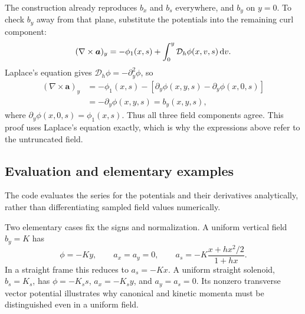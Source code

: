 The construction already reproduces \(b_x\) and \(b_s\) everywhere,
and \(b_y\) on \(y=0\). To check \(b_y\) away from that plane,
substitute the potentials into the remaining curl component:
\begin{equation}
 (\nabla\times\bm a)_y
 =-\phi_1(x,s)+\int_0^y\mathcal D_h\phi(x,v,s)\,\text{d} v.
\end{equation}
Laplace's equation gives \(\mathcal D_h\phi=-\partial_y^2\phi\), so
\begin{align}
 (\nabla\times\bm a)_y
 &=-\phi_1(x,s)
   -\left[\partial_y\phi(x,y,s)-\partial_y\phi(x,0,s)\right]\\
 &=-\partial_y\phi(x,y,s)=b_y(x,y,s),
\end{align}
where \(\partial_y\phi(x,0,s)=\phi_1(x,s)\). Thus all three field
components agree. This proof uses Laplace's equation exactly, which is why
the expressions above refer to the untruncated field.

\subsection{Evaluation and elementary examples}

The code evaluates the series for the potentials and
their derivatives analytically, rather than differentiating sampled field
values numerically.

Two elementary cases fix the signs and normalization. A uniform vertical
field \(b_y=K\) has
\begin{equation}
 \phi=-Ky,\qquad a_x=a_y=0,\qquad
 a_s=-K\frac{x+hx^2/2}{1+hx}.
\end{equation}
In a straight frame this reduces to \(a_s=-Kx\). A uniform straight
solenoid, \(b_s=K_s\), has \(\phi=-K_s s\), \(a_x=-K_s y\), and
\(a_y=a_s=0\). Its nonzero transverse vector potential illustrates why
canonical and kinetic momenta must be distinguished even in a uniform field.




